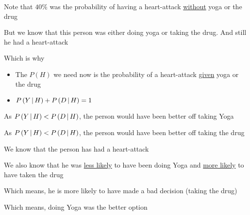 \documentclass[14pt,fleqn]{extarticle}
\begin{document}
Note that $40\%$ was the probability of having a heart-attack \underline{without} yoga or  the drug \newline 

But we know that this person was either doing yoga or taking the drug. And still he had a heart-attack \newline 

Which is why 

\begin{itemize}
\item{The $P(H)$ we need now is the probability of a heart-attack \underline{given} yoga or the drug} 
\item{ $P\left(Y\,\vert\,H\right) + P\left(D\,\vert\,H\right) = 1$} 
\end{itemize}


\newcard 

As $P\left(Y\,\vert\,H\right) < P\left(D\,\vert\,H\right)$, the person would have been better off taking Yoga 

\newcard 

As $P\left(Y\,\vert\,H\right) < P\left(D\,\vert\,H\right)$, the person would have been better off taking the drug 

\newcard 

We know that the person has had a heart-attack \newline 

We also know that he was \underline{less likely} to have been doing Yoga and \underline{more likely} to have taken the drug \newline 

Which means, he is more likely to have made a bad decision (taking the drug) \newline 

Which means, doing Yoga was the better option  
\end{document}
